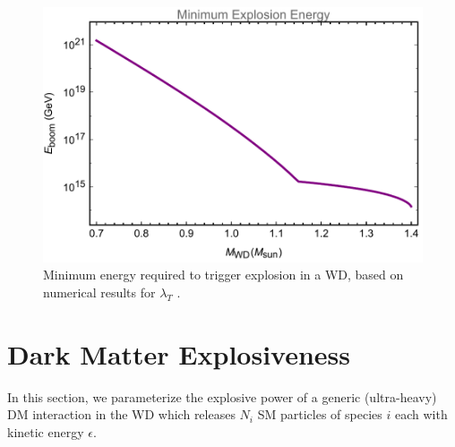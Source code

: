 \documentclass[twocolumn,showpacs,preprintnumbers,amsmath,amssymb,prd]{revtex4}
\begin{document}
\begin{figure}
\includegraphics[scale=.45]{Eboom.pdf}
\caption{Minimum energy required to trigger explosion in a WD, based on numerical results for $\lambda_T$ \cite{Woosley}.}
\label{fig:Eboom}
\end{figure}

\section{Dark Matter Explosiveness}
\label{sec:DMexplode}
In this section, we parameterize the explosive power of a generic (ultra-heavy) DM interaction in the WD which releases $N_i$ SM particles of species $i$ each with kinetic energy $\epsilon$.
\end{document}

